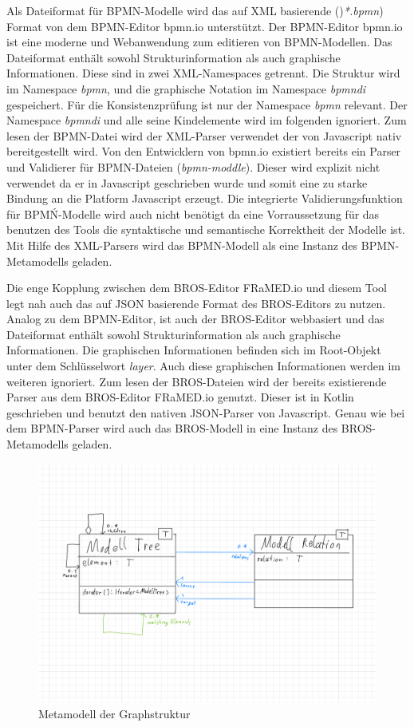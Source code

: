 Als Dateiformat für BPMN-Modelle wird das auf XML basierende ()\emph{*.bpmn}) Format von dem BPMN-Editor bpmn.io unterstützt.
Der BPMN-Editor bpmn.io ist eine moderne und Webanwendung zum editieren von BPMN-Modellen.
Das Dateiformat enthält sowohl Strukturinformation als auch graphische Informationen.
Diese sind in zwei XML-Namespaces getrennt.
Die Struktur wird im Namespace \emph{bpmn}, und die graphische Notation im Namespace \emph{bpmndi} gespeichert.
Für die Konsistenzprüfung ist nur der Namespace \emph{bpmn} relevant.
Der Namespace \emph{bpmndi} und alle seine Kindelemente wird im folgenden ignoriert.
Zum lesen der BPMN-Datei wird der XML-Parser verwendet der von Javascript nativ bereitgestellt wird.
Von den Entwicklern von bpmn.io existiert bereits ein Parser und Validierer für BPMN-Dateien (\emph{bpmn-moddle}).
Dieser wird explizit nicht verwendet da er in Javascript geschrieben wurde und somit eine zu starke Bindung an die Platform Javascript erzeugt.
Die integrierte Validierungsfunktion für BPMŃ-Modelle wird auch nicht benötigt da eine Vorraussetzung für das benutzen des Tools die syntaktische und semantische Korrektheit der Modelle ist. 
Mit Hilfe des XML-Parsers wird das BPMN-Modell als eine Instanz des BPMN-Metamodells geladen.

Die enge Kopplung zwischen dem BROS-Editor FRaMED.io und diesem Tool legt nah auch das auf JSON basierende Format des BROS-Editors zu nutzen.
Analog zu dem BPMN-Editor, ist auch der BROS-Editor webbasiert und das Dateiformat enthält sowohl Strukturinformation als auch graphische Informationen.
Die graphischen Informationen befinden sich im Root-Objekt unter dem Schlüsselwort \emph{layer}.
Auch diese graphischen Informationen werden im weiteren ignoriert.
Zum lesen der BROS-Dateien wird der bereits existierende Parser aus dem BROS-Editor FRaMED.io genutzt.
Dieser ist in Kotlin geschrieben und benutzt den nativen JSON-Parser von Javascript.
Genau wie bei dem BPMN-Parser wird auch das BROS-Modell in eine Instanz des BROS-Metamodells geladen.

\begin{figure}
    \includegraphics[width=\textwidth,keepaspectratio]{../images/UmlGraph.pdf}%
    \caption{Metamodell der Graphstruktur}%
    \label{fig:UmlGraph}
\end{figure}

